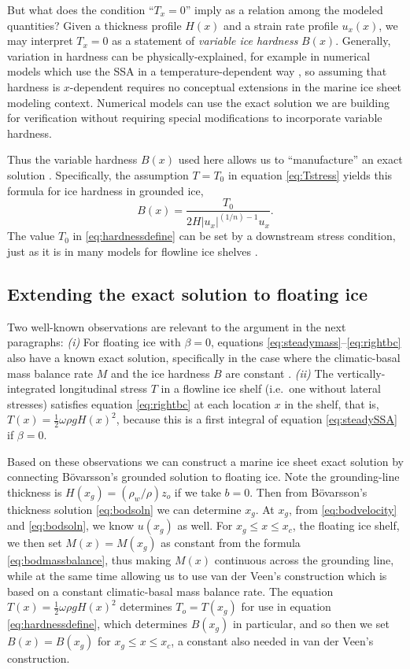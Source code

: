 \documentclass[twocolumn]{igs}
\renewcommand{\dh}{\fontencoding{T1}\selectfont{\symbol{240}}}
\newcommand{\bod}{B\"o\dh varsson\xspace}
\begin{document}
But what does the condition ``$T_x = 0$'' imply as a relation among the modeled quantities?  Given a thickness profile $H(x)$ and a strain rate profile $u_x(x)$, we may interpret $T_x = 0$ as a statement of \emph{variable ice hardness} $B(x)$.  Generally, variation in hardness can be physically-explained, for example in numerical models which use the SSA in a temperature-dependent way \citep{BBssasliding}, so assuming that hardness is $x$-dependent requires no conceptual extensions in the marine ice sheet modeling context.  Numerical models can use the exact solution we are building for verification without requiring special modifications to incorporate variable hardness.

Thus the variable hardness $B(x)$ used here allows us to ``manufacture'' an exact solution \citep{BLKCB}.  Specifically, the assumption $T=T_0$ in equation \eqref{eq:Tstress} yields this formula for ice hardness in grounded ice,
\begin{equation}
B(x) = \frac{T_0}{2 H |u_x|^{(1/n)-1} u_x}. \label{eq:hardnessdefine}
\end{equation}
The value $T_0$ in \eqref{eq:hardnessdefine} can be set by a downstream stress condition, just as it is in many models for flowline ice shelves \citep[e.g.][]{MISMIP2012,SchoofMarine1}.


\subsection*{Extending the exact solution to floating ice}  Two well-known observations are relevant to the argument in the next paragraphs:  \emph{(i)}  For floating ice with $\beta=0$, equations \eqref{eq:steadymass}--\eqref{eq:rightbc} also have a known exact solution, specifically in the case where the climatic-basal mass balance rate $M$ and the ice hardness $B$ are constant \citep{vanderVeen83,vanderVeen}.  \emph{(ii)}  The vertically-integrated longitudinal stress $T$ in a flowline ice shelf (i.e.~one without lateral stresses) satisfies equation \eqref{eq:rightbc} at each location $x$ in the shelf, that is, $T(x) = \frac{1}{2} \omega \rho g H(x)^2$, because this is a first integral of equation \eqref{eq:steadySSA} if $\beta=0$.

Based on these observations we can construct a marine ice sheet exact solution by connecting \bod's grounded solution to floating ice.  Note the grounding-line thickness is $H(x_g) = (\rho_w/\rho) z_o$ if we take $b=0$.  Then from \bod's thickness solution \eqref{eq:bodsoln} we can determine $x_g$.  At $x_g$, from \eqref{eq:bodvelocity} and \eqref{eq:bodsoln}, we know $u(x_g)$ as well.  For $x_g \le x \le x_c$, the floating ice shelf, we then set $M(x) = M(x_g)$ as constant from the formula \eqref{eq:bodmassbalance}, thus making $M(x)$ continuous across the grounding line, while at the same time allowing us to use van der Veen's construction which is based on a constant climatic-basal mass balance rate.  The equation $T(x) = \frac{1}{2} \omega \rho g H(x)^2$ determines $T_o=T(x_g)$ for use in equation \eqref{eq:hardnessdefine}, which determines $B(x_g)$ in particular, and so then we set $B(x)=B(x_g)$ for $x_g \le x \le x_c$, a constant also needed in van der Veen's construction.
\end{document}
